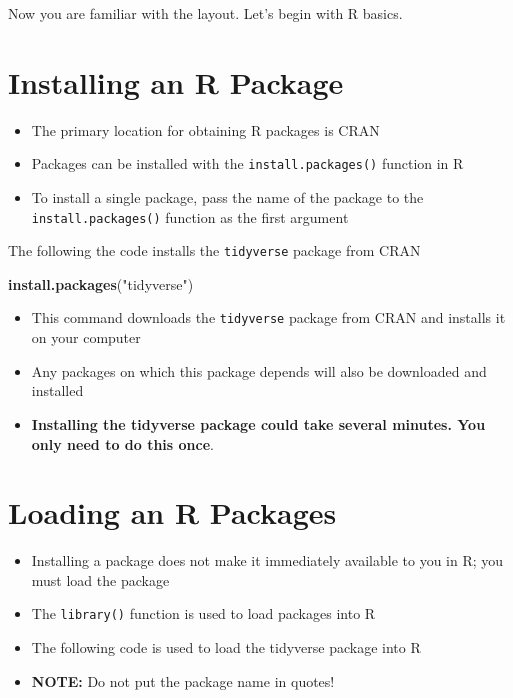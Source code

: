 \documentclass[
]{book}
\newenvironment{Shaded}{\begin{snugshade}}{\end{snugshade}}
\newcommand{\FunctionTok}[1]{\textcolor[rgb]{0.13,0.29,0.53}{\textbf{#1}}}
\newcommand{\NormalTok}[1]{#1}
\newcommand{\StringTok}[1]{\textcolor[rgb]{0.31,0.60,0.02}{#1}}
\begin{document}
Now you are familiar with the layout. Let's begin with R basics.

\hypertarget{installing-an-r-package}{%
\section{Installing an R Package}\label{installing-an-r-package}}

\begin{itemize}
\item
  The primary location for obtaining R packages is CRAN
\item
  Packages can be installed with the \texttt{install.packages()} function in R
\item
  To install a single package, pass the name of the package to the \texttt{install.packages()} function as the first argument
\end{itemize}

The following the code installs the \texttt{tidyverse} package from CRAN

\begin{Shaded}
\begin{Highlighting}[]
\FunctionTok{install.packages}\NormalTok{(}\StringTok{"tidyverse"}\NormalTok{)}
\end{Highlighting}
\end{Shaded}

\begin{itemize}
\item
  This command downloads the \texttt{tidyverse} package from CRAN and installs it on your computer
\item
  Any packages on which this package depends will also be downloaded and installed
\item
  \textbf{Installing the tidyverse package could take several minutes. You only need to do this once}.
\end{itemize}

\hypertarget{loading-an-r-packages}{%
\section{Loading an R Packages}\label{loading-an-r-packages}}

\begin{itemize}
\item
  Installing a package does not make it immediately available to you in R; you must load the package
\item
  The \texttt{library()} function is used to load packages into R
\item
  The following code is used to load the tidyverse package into R
\item
  \textbf{NOTE:} Do not put the package name in quotes!
\end{itemize}
\end{document}
